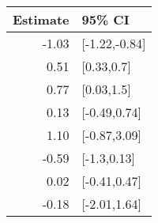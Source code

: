 \begin{tabular}{rl}
  \hline
Estimate & 95\% CI \\ 
  \hline
-1.03 & [-1.22,-0.84] \\ 
  0.51 & [0.33,0.7] \\ 
  0.77 & [0.03,1.5] \\ 
  0.13 & [-0.49,0.74] \\ 
  1.10 & [-0.87,3.09] \\ 
  -0.59 & [-1.3,0.13] \\ 
  0.02 & [-0.41,0.47] \\ 
  -0.18 & [-2.01,1.64] \\ 
   \hline
\end{tabular}

